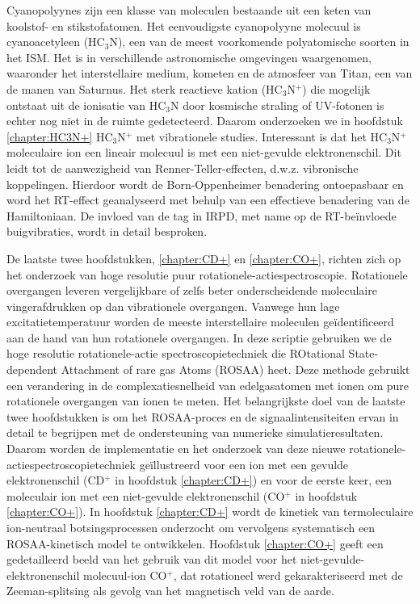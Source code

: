 {Cyanopolyynes zijn een klasse van moleculen bestaande uit een keten van koolstof- en stikstofatomen. Het eenvoudigste cyanopolyyne molecuul is cyanoacetyleen (HC$_3$N), een van de meest voorkomende polyatomische soorten in het ISM. Het is in verschillende astronomische omgevingen waargenomen, waaronder het interstellaire medium, kometen en de atmosfeer van Titan, een van de manen van Saturnus. Het sterk reactieve kation (HC$_3$N$^+$) die mogelijk ontstaat uit de ionisatie van HC$_3$N door kosmische straling of UV-fotonen is echter nog niet in de ruimte gedetecteerd. Daarom onderzoeken we in hoofdstuk \ref{chapter:HC3N+} HC$_3$N$^+$ met vibrationele studies. Interessant is dat het HC$_3$N$^+$ moleculaire ion een lineair molecuul is met een niet-gevulde elektronenschil. Dit leidt tot de aanwezigheid van Renner-Teller-effecten, d.w.z. vibronische koppelingen. Hierdoor wordt de Born-Oppenheimer benadering ontoepasbaar en word het RT-effect geanalyseerd met behulp van een effectieve benadering van de Hamiltoniaan. De invloed van de tag in IRPD, met name op de RT-be\"{i}nvloede buigvibraties, wordt in detail besproken.

De laatste twee hoofdstukken, \ref{chapter:CD+} en \ref{chapter:CO+}, richten zich op het onderzoek van hoge resolutie puur 
rotationele-actiespectroscopie. Rotationele overgangen leveren vergelijkbare of zelfs beter onderscheidende moleculaire 
vingerafdrukken op dan vibrationele overgangen. Vanwege hun lage excitatietemperatuur worden de meeste interstellaire 
moleculen geïdentificeerd aan de hand van hun rotationele overgangen. In deze scriptie gebruiken we de hoge resolutie 
rotationele-actie spectroscopietechniek die ROtational State-dependent Attachment of rare gas Atoms (ROSAA) heet. Deze 
methode gebruikt een verandering in de complexatiesnelheid van edelgasatomen met ionen om pure rotationele overgangen 
van ionen te meten. Het belangrijkste doel van de laatste twee hoofdstukken is om het ROSAA-proces en de 
signaalintensiteiten ervan in detail te begrijpen met de ondersteuning van numerieke simulatieresultaten. Daarom worden 
de implementatie en het onderzoek van deze nieuwe rotationele-actiespectroscopietechniek geïllustreerd voor een ion met 
een gevulde elektronenschil (CD$^+$ in hoofdstuk \ref{chapter:CD+}) en voor de eerste keer, een moleculair ion met een 
niet-gevulde elektronenschil (CO$^+$ in hoofdstuk \ref{chapter:CO+}). In hoofdstuk \ref{chapter:CD+} wordt de kinetiek 
van termoleculaire ion-neutraal botsingsprocessen onderzocht om vervolgens systematisch een ROSAA-kinetisch model te 
ontwikkelen. Hoofdstuk \ref{chapter:CO+} geeft een gedetailleerd beeld van het gebruik van dit model voor het 
niet-gevulde-elektronenschil molecuul-ion CO$^+$, dat rotationeel werd gekarakteriseerd met de Zeeman-splitsing als 
gevolg van het magnetisch veld van de aarde.

}
